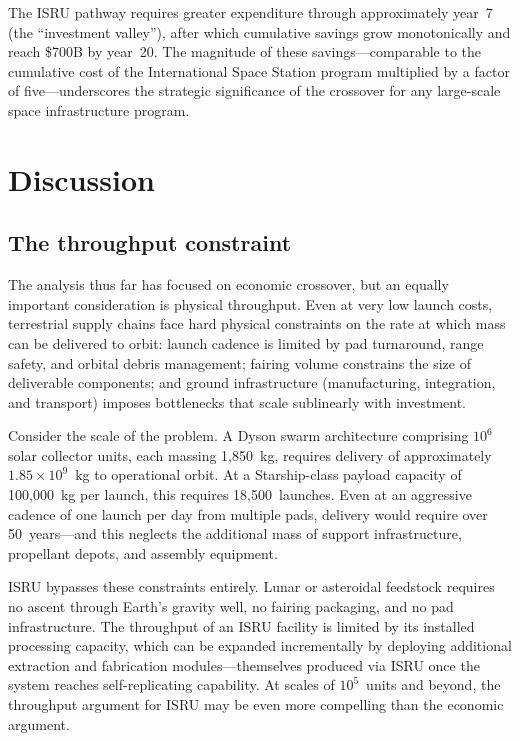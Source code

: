 \documentclass[preprint,12pt]{elsarticle}
\begin{document}
The ISRU pathway requires greater expenditure through approximately year~7 (the ``investment valley''), after which cumulative savings grow monotonically and reach \$700B by year~20. The magnitude of these savings---comparable to the cumulative cost of the International Space Station program multiplied by a factor of five---underscores the strategic significance of the crossover for any large-scale space infrastructure program.

\section{Discussion}
\label{sec:discussion}

\subsection{The throughput constraint}

The analysis thus far has focused on economic crossover, but an equally important consideration is physical throughput. Even at very low launch costs, terrestrial supply chains face hard physical constraints on the rate at which mass can be delivered to orbit: launch cadence is limited by pad turnaround, range safety, and orbital debris management; fairing volume constrains the size of deliverable components; and ground infrastructure (manufacturing, integration, and transport) imposes bottlenecks that scale sublinearly with investment.

Consider the scale of the problem. A Dyson swarm architecture comprising $10^6$ solar collector units, each massing 1{,}850~kg, requires delivery of approximately $1.85 \times 10^9$~kg to operational orbit. At a Starship-class payload capacity of 100{,}000~kg per launch, this requires 18{,}500~launches. Even at an aggressive cadence of one launch per day from multiple pads, delivery would require over 50~years---and this neglects the additional mass of support infrastructure, propellant depots, and assembly equipment.

ISRU bypasses these constraints entirely. Lunar or asteroidal feedstock requires no ascent through Earth's gravity well, no fairing packaging, and no pad infrastructure. The throughput of an ISRU facility is limited by its installed processing capacity, which can be expanded incrementally by deploying additional extraction and fabrication modules---themselves produced via ISRU once the system reaches self-replicating capability. At scales of $10^5$~units and beyond, the throughput argument for ISRU may be even more compelling than the economic argument.
\end{document}

